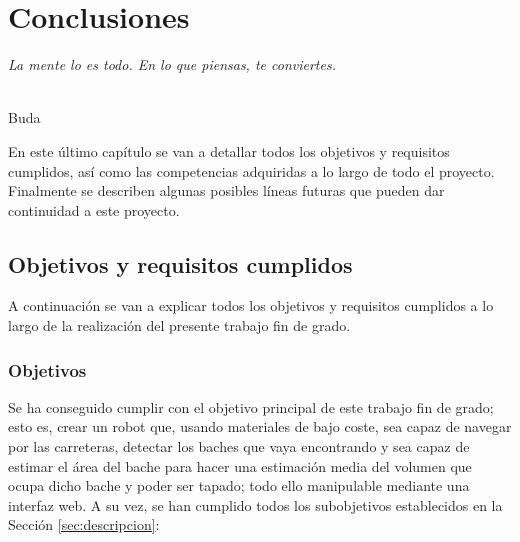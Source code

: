 \chapter{Conclusiones}
\label{cap:capitulo8}

\begin{flushright}
\begin{minipage}[]{10cm}
\emph{La mente lo es todo. En lo que piensas, te conviertes.}\\
\end{minipage}\\

Buda\\
\end{flushright}

\vspace{1cm}

En este último capítulo se van a detallar todos los objetivos y requisitos cumplidos, así como las competencias adquiridas a lo largo de todo el proyecto. Finalmente se describen algunas posibles líneas futuras que pueden dar continuidad a este proyecto.


\section{Objetivos y requisitos cumplidos}

A continuación se van a explicar todos los objetivos y requisitos cumplidos a lo largo de la realización del presente trabajo fin de grado. 

\subsection{Objetivos}

Se ha conseguido cumplir con el objetivo principal de este trabajo fin de grado; esto es, crear un robot que, usando materiales de bajo coste, sea capaz de navegar por las carreteras, detectar los baches que vaya encontrando y sea capaz de estimar el área del bache para hacer una estimación media del volumen que ocupa dicho bache y poder ser tapado; todo ello manipulable mediante una interfaz web. A su vez, se han cumplido todos los subobjetivos establecidos en la Sección \ref{sec:descripcion}:

